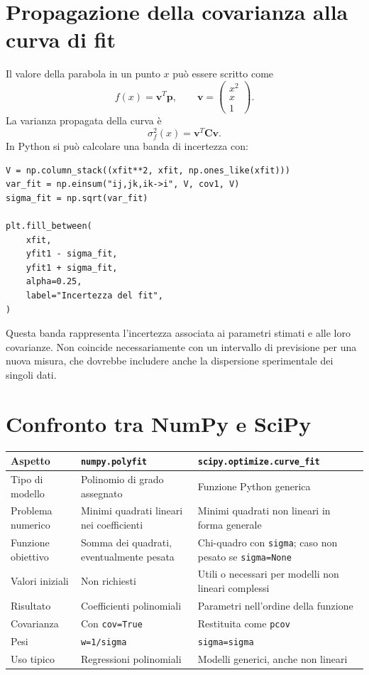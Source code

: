 \documentclass[11pt,a4paper]{book}
\begin{document}
\section{Propagazione della covarianza alla curva di fit}
Il valore della parabola in un punto $x$ può essere scritto come
\[
 f(x)=\mathbf{v}^{T}\mathbf{p},
 \qquad
 \mathbf{v}=\begin{pmatrix}x^2\\x\\1\end{pmatrix}.
\]
La varianza propagata della curva è
\[
 \sigma_f^2(x)=\mathbf{v}^{T}\mathbf{C}\mathbf{v}.
\]
In Python si può calcolare una banda di incertezza con:
\begin{lstlisting}
V = np.column_stack((xfit**2, xfit, np.ones_like(xfit)))
var_fit = np.einsum("ij,jk,ik->i", V, cov1, V)
sigma_fit = np.sqrt(var_fit)

plt.fill_between(
    xfit,
    yfit1 - sigma_fit,
    yfit1 + sigma_fit,
    alpha=0.25,
    label="Incertezza del fit",
)
\end{lstlisting}
Questa banda rappresenta l'incertezza associata ai parametri stimati e alle loro covarianze. Non coincide necessariamente con un intervallo di previsione per una nuova misura, che dovrebbe includere anche la dispersione sperimentale dei singoli dati.

\section{Confronto tra NumPy e SciPy}
\begin{center}
\begin{tabular}{p{}p{}p{}}
\toprule
Aspetto & \texttt{numpy.polyfit} & \texttt{scipy.optimize.curve\_fit}\\
\midrule
Tipo di modello & Polinomio di grado assegnato & Funzione Python generica\\
Problema numerico & Minimi quadrati lineari nei coefficienti & Minimi quadrati non lineari in forma generale\\
Funzione obiettivo & Somma dei quadrati, eventualmente pesata & Chi-quadro con \texttt{sigma}; caso non pesato se \texttt{sigma=None}\\
Valori iniziali & Non richiesti & Utili o necessari per modelli non lineari complessi\\
Risultato & Coefficienti polinomiali & Parametri nell'ordine della funzione\\
Covarianza & Con \texttt{cov=True} & Restituita come \texttt{pcov}\\
Pesi & \texttt{w=1/sigma} & \texttt{sigma=sigma}\\
Uso tipico & Regressioni polinomiali & Modelli generici, anche non lineari\\
\bottomrule
\end{tabular}
\end{center}
\end{document}
